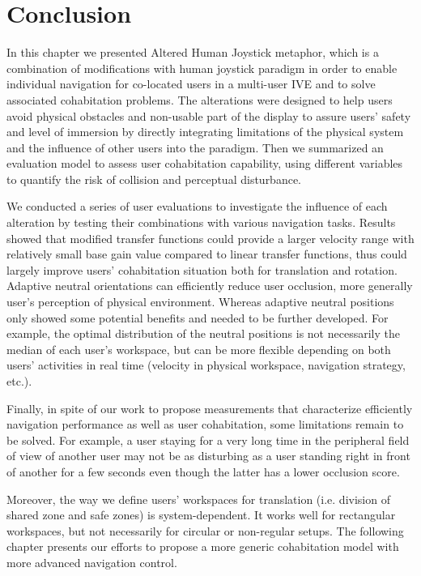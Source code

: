 

\section{Conclusion}
In this chapter we presented Altered Human Joystick metaphor, which is a combination of modifications with human joystick paradigm in order to enable individual navigation for co-located users in a multi-user IVE and to solve associated cohabitation problems. The alterations were designed to help users avoid physical obstacles and non-usable part of the display to assure users' safety and level of immersion by directly integrating limitations of the physical system and the influence of other users into the paradigm. Then we summarized an evaluation model to assess user cohabitation capability, using different variables to quantify the risk of collision and perceptual disturbance.

We conducted a series of user evaluations to investigate the influence of each alteration by testing their combinations with various navigation tasks. Results showed that modified transfer functions could provide a larger velocity range with relatively small base gain value compared to linear transfer functions, thus could largely improve users' cohabitation situation both for translation and rotation. Adaptive neutral orientations can efficiently reduce user occlusion, more generally user's perception of physical environment. Whereas adaptive neutral positions only showed some potential benefits and needed to be further developed. For example, the optimal distribution of the neutral positions is not necessarily the median of each user's workspace, but can be more flexible depending on both users' activities in real time (velocity in physical workspace, navigation strategy, etc.).

Finally, in spite of our work to propose measurements that characterize efficiently navigation performance as well as user cohabitation, some limitations remain to be solved. For example, a user staying for a very long time in the peripheral field of view of another user may not be as disturbing as a user standing right in front of another for a few seconds even though the latter has a lower occlusion score.

Moreover, the way we define users' workspaces for translation (i.e. division of shared zone and safe zones) is system-dependent. It works well for rectangular workspaces, but not necessarily for circular or non-regular setups. The following chapter presents our efforts to propose a more generic cohabitation model with more advanced navigation control. 